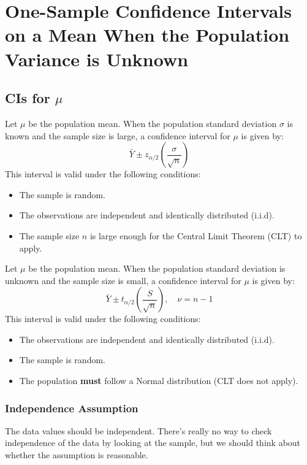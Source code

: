 \chapter{One-Sample Confidence Intervals on a Mean When the Population Variance is Unknown}
\section{CIs for \(\mu\)}
\begin{definition}

Let \(\mu\) be the population mean. When the population standard deviation \(\sigma\) is known and the sample size is large, a confidence interval for \(\mu\) is given by:
\[
\bar{Y} \pm z_{\alpha/2} \left( \frac{\sigma}{\sqrt{n}} \right)
\]
This interval is valid under the following conditions:
\begin{itemize}
  \item The sample is random.
  \item The observations are independent and identically distributed (i.i.d).
  \item The sample size \(n\) is large enough for the Central Limit Theorem (CLT) to apply.
\end{itemize}
\end{definition}

\begin{definition}


Let \(\mu\) be the population mean. When the population standard deviation is unknown and the sample size is small, a confidence interval for \(\mu\) is given by:
\[
\bar{Y} \pm t_{\alpha/2} \left( \frac{S}{\sqrt{n}} \right), \quad \nu = n - 1
\]
This interval is valid under the following conditions:
\begin{itemize}
  \item The observations are independent and identically distributed (i.i.d).
  \item The sample is random.
  \item The population \textbf{must} follow a Normal distribution (CLT does not apply).
\end{itemize}
\end{definition}
\subsection*{Independence Assumption}

The data values should be independent. There’s really no way to check independence of the data by looking at the sample, but we should think about whether the assumption is reasonable.
